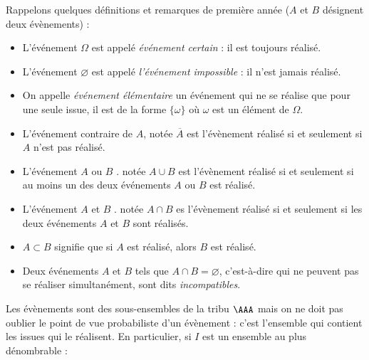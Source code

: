 \documentclass[french,11pt,twoside]{VcCours}
\begin{document}
%
%
%
Rappelons quelques définitions et remarques de première année ($A$ et $B$ désignent deux évènements) : 


\begin{itemize}
  \item L'événement $\Omega$ est appelé \emph{événement certain} : il est toujours réalisé.
  \item L'événement $\varnothing$ est appelé \emph{l'événement impossible} : il n'est jamais réalisé.
  \item On appelle \emph{événement élémentaire} un événement qui ne se réalise que pour une seule issue, il est de la forme $\{\omega\}$ où $\omega$ est un élément de $\Omega$.
 \item L'événement contraire de $A$, notée $\overline{A}$ est l'évènement réalisé si et seulement si $A$ n'est pas réalisé.
  \item L'événement \og $A$ ou $B$ \fg{}. notée $A \cup B$ est l'évènement réalisé si et seulement si au moins un des deux événements $A$ ou $B$ est réalisé.
  \item L'événement \og $A$ et $B$ \fg{}. notée $A \cap B$ es l'évènement réalisé si et seulement si les deux événements $A$ et $B$ sont réalisés.
\item $A \subset B$ signifie que si $A$ est réalisé, alors $B$ est réalisé.
\item Deux événements $A$ et $B$ tels que $A \cap B=\varnothing$, c'est-à-dire qui ne peuvent pas se réaliser simultanément, sont dits \emph{incompatibles}.
\end{itemize}



Les évènements sont des sous-ensembles de la tribu $\AAA$ mais on ne doit pas oublier le point de vue probabiliste d'un évènement : c'est l'ensemble qui contient les issues qui le réalisent. En particulier, si $I$ est un ensemble au plus dénombrable :
\end{document}
